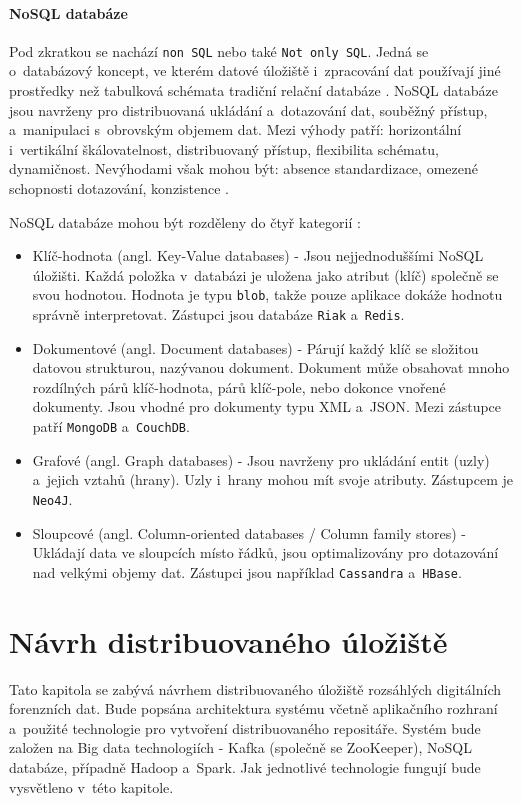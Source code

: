 \subsubsection{NoSQL databáze}
Pod zkratkou se nachází \texttt{non SQL} nebo také \texttt{Not only SQL}. Jedná se o~databázový koncept, ve kterém datové úložiště i~zpracování dat používají jiné prostředky než tabulková schémata tradiční relační databáze \cite{noSqlWiki}. NoSQL databáze jsou navrženy pro distribuovaná ukládání a~dotazování dat, souběžný přístup, a~manipulaci s~obrovským objemem dat. Mezi výhody patří: horizontální i~vertikální škálovatelnost, distribuovaný přístup, flexibilita schématu, dynamičnost. Nevýhodami však mohou být: absence standardizace, omezené schopnosti dotazování, konzistence \cite{noSqlIntro}.

\vspace{0.5cm}
\noindent NoSQL databáze mohou být rozděleny do čtyř kategorií \cite{noSqlOverview}:
\begin{itemize}
    \item Klíč-hodnota (angl. Key-Value databases) - Jsou nejjednoduššími NoSQL úložišti. Každá položka v~databázi je uložena jako atribut (klíč) společně se svou hodnotou. Hodnota je typu \texttt{blob}, takže pouze aplikace dokáže hodnotu správně interpretovat. Zástupci jsou databáze \texttt{Riak} a~\texttt{Redis}.
    
    \item Dokumentové (angl. Document databases) - Párují každý klíč se složitou datovou strukturou, nazývanou dokument. Dokument může obsahovat mnoho rozdílných párů klíč-hodnota, párů klíč-pole, nebo dokonce vnořené dokumenty. Jsou vhodné pro dokumenty typu XML a~JSON. Mezi zástupce patří \texttt{MongoDB} a~\texttt{CouchDB}.
    
    \item Grafové (angl. Graph databases) - Jsou navrženy pro ukládání entit (uzly) a~jejich vztahů (hrany). Uzly i~hrany mohou mít svoje atributy. Zástupcem je \texttt{Neo4J}.
    
    \item Sloupcové (angl. Column-oriented databases / Column family stores) - Ukládají data ve sloupcích místo řádků, jsou optimalizovány pro dotazování nad velkými objemy dat. Zástupci jsou například \texttt{Cassandra} a~\texttt{HBase}.
\end{itemize}

\chapter{Návrh distribuovaného úložiště} \label{distrRepDesignChapter}
Tato kapitola se zabývá návrhem distribuovaného úložiště rozsáhlých digitálních forenzních dat. Bude popsána architektura systému včetně aplikačního rozhraní a~použité technologie pro vytvoření distribuovaného repositáře.
Systém bude založen na Big data technologiích - Kafka (společně se ZooKeeper), NoSQL databáze, případně Hadoop a~Spark. Jak jednotlivé technologie fungují bude vysvětleno v~této kapitole.

